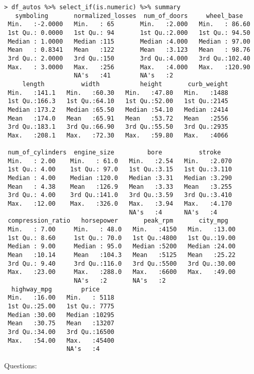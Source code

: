 \documentclass{article}
\begin{document}
\begin{lstlisting}
> df_autos %>% select_if(is.numeric) %>% summary
   symboling       normalized_losses  num_of_doors     wheel_base
 Min.   :-2.0000   Min.   : 65       Min.   :2.000   Min.   : 86.60
 1st Qu.: 0.0000   1st Qu.: 94       1st Qu.:2.000   1st Qu.: 94.50
 Median : 1.0000   Median :115       Median :4.000   Median : 97.00
 Mean   : 0.8341   Mean   :122       Mean   :3.123   Mean   : 98.76
 3rd Qu.: 2.0000   3rd Qu.:150       3rd Qu.:4.000   3rd Qu.:102.40
 Max.   : 3.0000   Max.   :256       Max.   :4.000   Max.   :120.90
                   NA's   :41        NA's   :2
     length          width           height       curb_weight
 Min.   :141.1   Min.   :60.30   Min.   :47.80   Min.   :1488
 1st Qu.:166.3   1st Qu.:64.10   1st Qu.:52.00   1st Qu.:2145
 Median :173.2   Median :65.50   Median :54.10   Median :2414
 Mean   :174.0   Mean   :65.91   Mean   :53.72   Mean   :2556
 3rd Qu.:183.1   3rd Qu.:66.90   3rd Qu.:55.50   3rd Qu.:2935
 Max.   :208.1   Max.   :72.30   Max.   :59.80   Max.   :4066

 num_of_cylinders  engine_size         bore          stroke
 Min.   : 2.00    Min.   : 61.0   Min.   :2.54   Min.   :2.070
 1st Qu.: 4.00    1st Qu.: 97.0   1st Qu.:3.15   1st Qu.:3.110
 Median : 4.00    Median :120.0   Median :3.31   Median :3.290
 Mean   : 4.38    Mean   :126.9   Mean   :3.33   Mean   :3.255
 3rd Qu.: 4.00    3rd Qu.:141.0   3rd Qu.:3.59   3rd Qu.:3.410
 Max.   :12.00    Max.   :326.0   Max.   :3.94   Max.   :4.170
                                  NA's   :4      NA's   :4
 compression_ratio   horsepower       peak_rpm       city_mpg
 Min.   : 7.00     Min.   : 48.0   Min.   :4150   Min.   :13.00
 1st Qu.: 8.60     1st Qu.: 70.0   1st Qu.:4800   1st Qu.:19.00
 Median : 9.00     Median : 95.0   Median :5200   Median :24.00
 Mean   :10.14     Mean   :104.3   Mean   :5125   Mean   :25.22
 3rd Qu.: 9.40     3rd Qu.:116.0   3rd Qu.:5500   3rd Qu.:30.00
 Max.   :23.00     Max.   :288.0   Max.   :6600   Max.   :49.00
                   NA's   :2       NA's   :2
  highway_mpg        price
 Min.   :16.00   Min.   : 5118
 1st Qu.:25.00   1st Qu.: 7775
 Median :30.00   Median :10295
 Mean   :30.75   Mean   :13207
 3rd Qu.:34.00   3rd Qu.:16500
 Max.   :54.00   Max.   :45400
                 NA's   :4
\end{lstlisting}

Questions:
\begin{enumerate}

\end{enumerate}

\newpage
\end{document}
